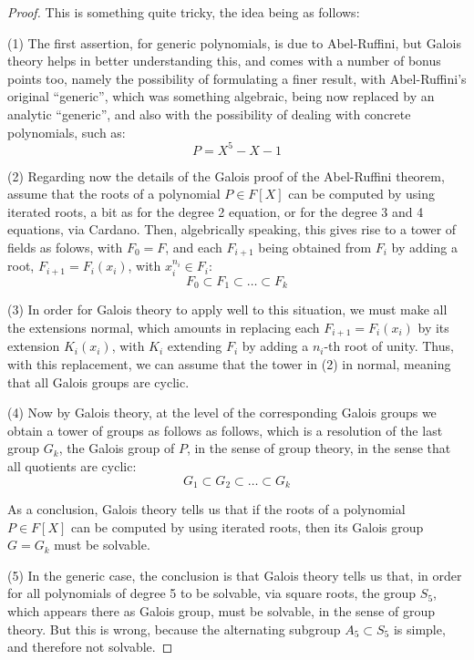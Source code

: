 \documentclass[12pt]{amsbook}
\begin{document}
\begin{proof}
This is something quite tricky, the idea being as follows:

\medskip

(1) The first assertion, for generic polynomials, is due to Abel-Ruffini, but Galois theory helps in better understanding this, and comes with a number of bonus points too, namely the possibility of formulating a finer result, with Abel-Ruffini's original ``generic'', which was something algebraic, being now replaced by an analytic ``generic'', and also with the possibility of dealing with concrete polynomials, such as:
$$P=X^5-X-1$$

(2) Regarding now the details of the Galois proof of the Abel-Ruffini theorem, assume that the roots of a polynomial $P\in F[X]$ can be computed by using iterated roots, a bit as for the degree 2 equation, or for the degree 3 and 4 equations, via Cardano. Then, algebrically speaking, this gives rise to a tower of fields as folows, with $F_0=F$, and each $F_{i+1}$ being obtained from $F_i$ by adding a root, $F_{i+1}=F_i(x_i)$, with $x_i^{n_i}\in F_i$:
$$F_0\subset F_1\subset\ldots\subset F_k$$

(3) In order for Galois theory to apply well to this situation, we must make all the extensions normal, which amounts in replacing each $F_{i+1}=F_i(x_i)$ by its extension $K_i(x_i)$, with $K_i$ extending $F_i$ by adding a $n_i$-th root of unity. Thus, with this replacement, we can assume that the tower in (2) in normal, meaning that all Galois groups are cyclic.

\medskip

(4) Now by Galois theory, at the level of the corresponding Galois groups we obtain a tower of groups as follows as follows, which is a resolution of the last group $G_k$, the Galois group of $P$, in the sense of group theory, in the sense that all quotients are cyclic:
$$G_1\subset G_2\subset\ldots\subset G_k$$

As a conclusion, Galois theory tells us that if the roots of a polynomial $P\in F[X]$ can be computed by using iterated roots, then its Galois group $G=G_k$ must be solvable.

\medskip

(5) In the generic case, the conclusion is that Galois theory tells us that, in order for all polynomials of degree 5 to be solvable, via square roots, the group $S_5$, which appears there as Galois group, must be solvable, in the sense of group theory. But this is wrong, because the alternating subgroup $A_5\subset S_5$ is simple, and therefore not solvable.


\end{proof}
\end{document}
